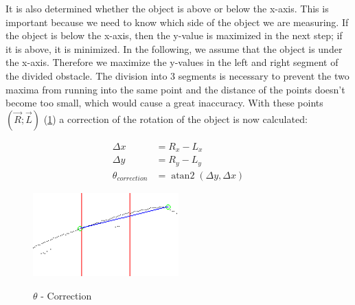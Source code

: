 \documentclass[11pt,oneside,openright]{mpreport}
\DeclareMathOperator{\atantwo}{atan2}
\begin{document}

It is also determined whether the object is above or below the x-axis. This is important because we need to know which side of the object we are measuring.
If the object is below the x-axis, then the y-value is maximized in the next step; if it is above, it is minimized.
In the following, we assume that the object is under the x-axis. Therefore we maximize the y-values in the left and right segment of the divided obstacle.
The division into 3 segments is necessary to prevent the two maxima from running into the same point and the distance of the points doesn't become too small, 
which would cause a great inaccuracy. With these points $(\vec{R};\vec{L})$ (\cref{obst_correction}) a correction of the rotation of the object is now calculated:




\begin{align*}
\Delta x &= R_x - L_x\\
\Delta y &= R_y - L_y\\
\theta_{correction} &= \atantwo(\Delta y,\Delta x)
\end{align*}


\begin{figure}[!ht]
\begin{center}
\caption{$\theta$ - Correction}
\includegraphics[width=0.5\textwidth]{bilder/obst_devide_angle.png}
\label{obst_correction}
\end{center}
\end{figure}
\end{document}
